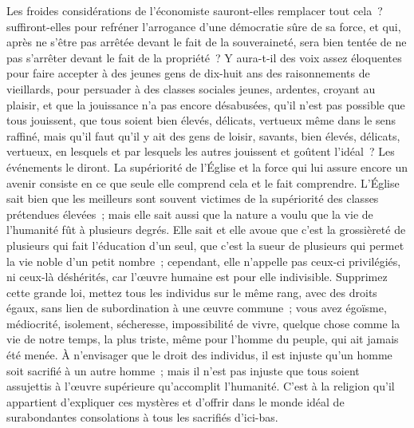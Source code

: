 \documentclass[french,twoside]{book} %
\begin{document}
Les froides considérations de l’économiste sauront-elles remplacer tout cela ? suffiront-elles pour refréner l’arrogance d’une démocratie sûre de sa force, et qui, après ne s’être pas arrêtée devant le fait de la souveraineté, sera bien tentée de ne pas s’arrêter devant le fait de la propriété ? Y aura-t-il des voix assez éloquentes pour faire accepter à des jeunes gens de dix-huit ans des raisonnements de vieillards, pour persuader à des classes sociales jeunes, ardentes, croyant au plaisir, et que la jouissance n’a pas encore désabusées, qu’il n’est pas possible que tous jouissent, que tous soient bien élevés, délicats, vertueux même dans le sens raffiné, mais qu’il faut qu’il y ait des gens de loisir, savants, bien élevés, délicats, vertueux, en lesquels et par lesquels les autres jouissent et goûtent l’idéal ? Les événements le diront. La supériorité de l’Église et la force qui lui assure encore un avenir consiste en ce que seule elle comprend cela et le fait comprendre. L’Église sait bien que les meilleurs sont souvent victimes de la supériorité des classes prétendues élevées ; mais elle sait aussi que la nature a voulu que la vie de l’humanité fût à plusieurs degrés. Elle sait et elle avoue que c’est la grossièreté de plusieurs qui fait l’éducation d’un seul, que c’est la sueur de plusieurs qui permet la vie noble d’un petit nombre ; cependant, elle n’appelle pas ceux-ci privilégiés, ni ceux-là déshérités, car l’œuvre humaine est pour elle indivisible. Supprimez cette grande loi, mettez tous les individus sur le même rang, avec des droits égaux, sans lien de subordination à une œuvre commune ; vous avez égoïsme, médiocrité, isolement, sécheresse, impossibilité de vivre, quelque chose comme la vie de notre temps, la plus triste, même pour l’homme du peuple, qui ait jamais été menée. À n’envisager que le droit des individus, il est injuste qu’un homme soit sacrifié à un autre homme ; mais il n’est pas injuste que tous soient assujettis à l’œuvre supérieure qu’accomplit l’humanité. C’est à la religion qu’il appartient d’expliquer ces mystères et d’offrir dans le monde idéal de surabondantes consolations à tous les sacrifiés d’ici-bas.\par
\end{document}
